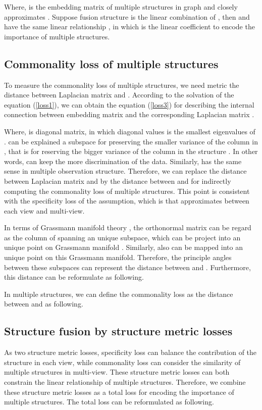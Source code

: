\documentclass[review]{elsarticle}
\begin{document}
Where,  is the embedding matrix of multiple structures in graph  and closely approximates . Suppose fusion structure  is the linear combination of , then  and  have the same linear relationship , in which  is the linear coefficient to encode the importance of multiple structures.

\subsection{Commonality loss of multiple structures}
\label{commonality}
To measure the commonality loss of multiple structures, we need metric the distance between Laplacian matrix  and .  According to the solvation of the equation (\ref{loss1}), we can obtain the equation (\ref{loss3}) for describing the internal connection between embedding matrix  and the corresponding Laplacian matrix .

Where,  is diagonal matrix, in which diagonal values is the smallest eigenvalues of .  can be explained a subspace for preserving the smaller variance of the column in , that is for reserving the bigger variance of the column in the structure . In other words,  can keep the more discrimination of the data. Similarly,  has the same sense in multiple observation structure. Therefore, we can replace the distance between Laplacian matrix  and  by the distance between  and  for indirectly computing the commonality loss of multiple structures. This point is consistent with  the specificity loss of the assumption, which is that  approximates  between each view and multi-view.

In terms of Grassmann manifold theory \cite{lin2012multi}\cite{turaga2011statistical}, the orthonormal matrix  can be regard as the column of  spanning an unique subspace, which can be project into an unique point on Grassmann manifold . Similarly,  also can be mapped into an unique point on this Grassmann manifold. Therefore, the principle angles  between these subspaces can represent the distance between  and . Furthermore, this distance can be reformulate as following\cite{dong2013clustering}.

In multiple structures, we can define  the commonality loss  as the distance between  and  as following.

\subsection{Structure fusion by structure metric losses}
\label{SF}
As two structure metric losses, specificity loss can balance the contribution of the structure in each view, while commonality loss can consider the similarity of multiple structures in multi-view. These structure metric losses can both constrain the linear relationship  of multiple structures. Therefore, we combine these structure metric losses as a total loss for encoding the importance of multiple structures. The total loss can be reformulated as following.
\end{document}
